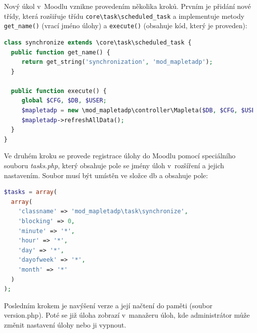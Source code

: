 \documentclass[
print,
  11pt,
  table,   
  nolof,    
  nolot,
  oneside,final
]{fithesis3}
\begin{document}
Nový úkol v~Moodlu vznikne provedením několika kroků. Prvním je přidání nové třídy, která rozšiřuje třídu \texttt{core{\textbackslash}task{\textbackslash}scheduled\_task} a implementuje metody \texttt{get\_name()} (vrací jméno úlohy) a \texttt{execute()} (obsahuje kód, který je proveden):
\begin{lstlisting}[language=PHP, caption=Implementace třídy je využíta jako naplánovaná úloha.]    
class synchronize extends \core\task\scheduled_task {
  public function get_name() {
     return get_string('synchronization', 'mod_mapletadp');
  }

  public function execute() {
     global $CFG, $DB, $USER;
     $mapletadp = new \mod_mapletadp\controller\Mapleta($DB, $CFG, $USER);
     $mapletadp->refreshAllData();
  }
}
\end{lstlisting}
Ve druhém kroku se provede registrace úlohy do Moodlu pomocí speciálního souboru \emph{tasks.php}, který obsahuje pole se jmény úloh v~rozšíření a jejich nastavením. Soubor musí být umístěn ve složce db a obsahuje pole:
\begin{lstlisting}[language=PHP, caption=Ukázka záznamu pole ze souboru tasks.php]    
$tasks = array(                                                                                                                    
  array(                                                                                                                          
    'classname' => 'mod_mapletadp\task\synchronize',                                                                            
    'blocking' => 0,                                                                                                            
    'minute' => '*',                                                                                                            
    'hour' => '*',                                                                                                              
    'day' => '*',                                                                                                               
    'dayofweek' => '*',                                                                                                         
    'month' => '*'                                                                                                              
  )
);
\end{lstlisting}
Posledním krokem je navýšení verze a její načtení do paměti (soubor version.php). Poté se již úloha zobrazí v~manažeru úloh, kde administrátor může změnit nastavení úlohy nebo ji vypnout.
\end{document}
